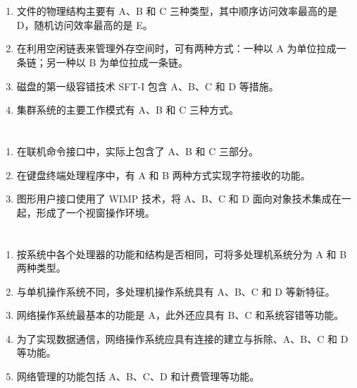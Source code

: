 \documentclass[UTF8]{ctexart}
\begin{document}
\section{}
\begin{enumerate}
	\item 文件的物理结构主要有 A、B 和 C 三种类型，其中顺序访问效率最高的是 D，随机访问效率最高的是 E。
	
	\item 在利用空闲链表来管理外存空间时，可有两种方式：一种以 A 为单位拉成一条链；另一种以 B 为单位拉成一条链。
	
	\item 磁盘的第一级容错技术 SFT-I 包含 A、B、C 和 D 等措施。
	
	\item 集群系统的主要工作模式有 A、B 和 C 三种方式。
\end{enumerate}

\section{}
\begin{enumerate}
	\item 在联机命令接口中，实际上包含了 A、B 和 C 三部分。
	
	\item 在键盘终端处理程序中，有 A 和 B 两种方式实现字符接收的功能。
	
	\item 图形用户接口使用了 WIMP 技术，将 A、B、C 和 D 面向对象技术集成在一起，形成了一个视窗操作环境。
\end{enumerate}

\section{}
\begin{enumerate}
	\item 按系统中各个处理器的功能和结构是否相同，可将多处理机系统分为 A 和 B 两种类型。
	
	\item 与单机操作系统不同，多处理机操作系统具有 A、B、C 和 D 等新特征。
	
	\item 网络操作系统最基本的功能是 A，此外还应具有 B、C 和系统容错等功能。
	
	\item 为了实现数据通信，网络操作系统应具有连接的建立与拆除、A、B、C 和 D 等功能。
	
	\item 网络管理的功能包括 A、B、C、D 和计费管理等功能。
\end{enumerate}
\end{document}
